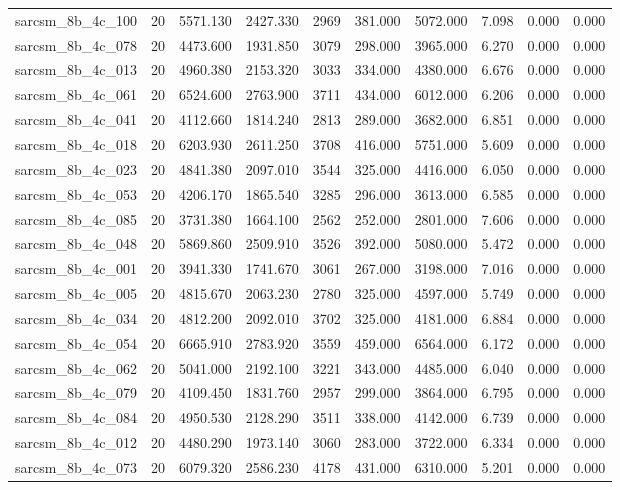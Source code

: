\begin{tabular}{lrrrrrrrrr}
sarcsm\_8b\_4c\_100 & 20 & 5571.130 & 2427.330 & 2969 & 381.000 & 5072.000 & 7.098 & 0.000 & 0.000 \\
sarcsm\_8b\_4c\_078 & 20 & 4473.600 & 1931.850 & 3079 & 298.000 & 3965.000 & 6.270 & 0.000 & 0.000 \\
sarcsm\_8b\_4c\_013 & 20 & 4960.380 & 2153.320 & 3033 & 334.000 & 4380.000 & 6.676 & 0.000 & 0.000 \\
sarcsm\_8b\_4c\_061 & 20 & 6524.600 & 2763.900 & 3711 & 434.000 & 6012.000 & 6.206 & 0.000 & 0.000 \\
sarcsm\_8b\_4c\_041 & 20 & 4112.660 & 1814.240 & 2813 & 289.000 & 3682.000 & 6.851 & 0.000 & 0.000 \\
sarcsm\_8b\_4c\_018 & 20 & 6203.930 & 2611.250 & 3708 & 416.000 & 5751.000 & 5.609 & 0.000 & 0.000 \\
sarcsm\_8b\_4c\_023 & 20 & 4841.380 & 2097.010 & 3544 & 325.000 & 4416.000 & 6.050 & 0.000 & 0.000 \\
sarcsm\_8b\_4c\_053 & 20 & 4206.170 & 1865.540 & 3285 & 296.000 & 3613.000 & 6.585 & 0.000 & 0.000 \\
sarcsm\_8b\_4c\_085 & 20 & 3731.380 & 1664.100 & 2562 & 252.000 & 2801.000 & 7.606 & 0.000 & 0.000 \\
sarcsm\_8b\_4c\_048 & 20 & 5869.860 & 2509.910 & 3526 & 392.000 & 5080.000 & 5.472 & 0.000 & 0.000 \\
sarcsm\_8b\_4c\_001 & 20 & 3941.330 & 1741.670 & 3061 & 267.000 & 3198.000 & 7.016 & 0.000 & 0.000 \\
sarcsm\_8b\_4c\_005 & 20 & 4815.670 & 2063.230 & 2780 & 325.000 & 4597.000 & 5.749 & 0.000 & 0.000 \\
sarcsm\_8b\_4c\_034 & 20 & 4812.200 & 2092.010 & 3702 & 325.000 & 4181.000 & 6.884 & 0.000 & 0.000 \\
sarcsm\_8b\_4c\_054 & 20 & 6665.910 & 2783.920 & 3559 & 459.000 & 6564.000 & 6.172 & 0.000 & 0.000 \\
sarcsm\_8b\_4c\_062 & 20 & 5041.000 & 2192.100 & 3221 & 343.000 & 4485.000 & 6.040 & 0.000 & 0.000 \\
sarcsm\_8b\_4c\_079 & 20 & 4109.450 & 1831.760 & 2957 & 299.000 & 3864.000 & 6.795 & 0.000 & 0.000 \\
sarcsm\_8b\_4c\_084 & 20 & 4950.530 & 2128.290 & 3511 & 338.000 & 4142.000 & 6.739 & 0.000 & 0.000 \\
sarcsm\_8b\_4c\_012 & 20 & 4480.290 & 1973.140 & 3060 & 283.000 & 3722.000 & 6.334 & 0.000 & 0.000 \\
sarcsm\_8b\_4c\_073 & 20 & 6079.320 & 2586.230 & 4178 & 431.000 & 6310.000 & 5.201 & 0.000 & 0.000 \\

\end{tabular}
